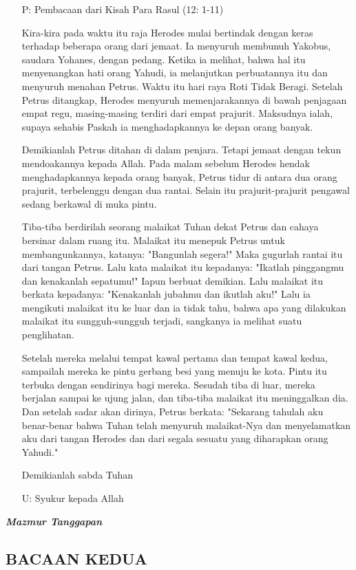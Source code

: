 \documentclass[a5paper,headsepline,titlepage,11pt,nnormalheadings]{scrbook}
\makeatletter
\newcommand{\BU}[1]{\begin{itemize} \item[U:] #1 \end{itemize}}
\newcommand{\BP}[1]{\begin{itemize} \item[P:] #1 \end{itemize}}
\newcommand{\lagu}[1]{%
  {\parindent \z@ \normalfont
    \interlinepenalty\@M \bfseries \emph{#1}\par\nobreak \vskip 20\p@ }}
\makeatother
\begin{document}
\BP{Pembacaan dari Kisah Para Rasul (12: 1-11) 

Kira-kira pada waktu itu raja Herodes mulai bertindak dengan keras terhadap beberapa orang dari jemaat.
Ia menyuruh membunuh Yakobus, saudara Yohanes, dengan pedang.
Ketika ia melihat, bahwa hal itu menyenangkan hati orang Yahudi, ia melanjutkan perbuatannya itu dan menyuruh menahan Petrus. Waktu itu hari raya Roti Tidak Beragi.
Setelah Petrus ditangkap, Herodes menyuruh memenjarakannya di bawah penjagaan empat regu, masing-masing terdiri dari empat prajurit. Maksudnya ialah, supaya sehabis Paskah ia menghadapkannya ke depan orang banyak.

Demikianlah Petrus ditahan di dalam penjara. Tetapi jemaat dengan tekun mendoakannya kepada Allah.
Pada malam sebelum Herodes hendak menghadapkannya kepada orang banyak, Petrus tidur di antara dua orang prajurit, terbelenggu dengan dua rantai. Selain itu prajurit-prajurit pengawal sedang berkawal di muka pintu.

Tiba-tiba berdirilah seorang malaikat Tuhan dekat Petrus dan cahaya bersinar dalam ruang itu. Malaikat itu menepuk Petrus untuk membangunkannya, katanya: "Bangunlah segera!" Maka gugurlah rantai itu dari tangan Petrus.
Lalu kata malaikat itu kepadanya: "Ikatlah pinggangmu dan kenakanlah sepatumu!" Iapun berbuat demikian. Lalu malaikat itu berkata kepadanya: "Kenakanlah jubahmu dan ikutlah aku!"
Lalu ia mengikuti malaikat itu ke luar dan ia tidak tahu, bahwa apa yang dilakukan malaikat itu sungguh-sungguh terjadi, sangkanya ia melihat suatu penglihatan.

Setelah mereka melalui tempat kawal pertama dan tempat kawal kedua, sampailah mereka ke pintu gerbang besi yang menuju ke kota. Pintu itu terbuka dengan sendirinya bagi mereka. Sesudah tiba di luar, mereka berjalan sampai ke ujung jalan, dan tiba-tiba malaikat itu meninggalkan dia.
Dan setelah sadar akan dirinya, Petrus berkata: "Sekarang tahulah aku benar-benar bahwa Tuhan telah menyuruh malaikat-Nya dan menyelamatkan aku dari tangan Herodes dan dari segala sesuatu yang diharapkan orang Yahudi."


Demikianlah sabda Tuhan }

\BU{Syukur kepada Allah} 

\lagu{Mazmur Tanggapan} 

\subsection*{BACAAN KEDUA}
\end{document}
